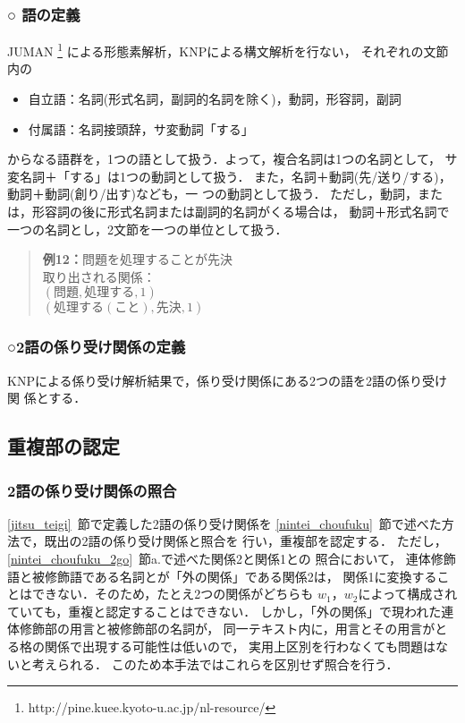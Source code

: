 \subsubsection*{○ 語の定義} \label{jitsu_teigi_go}
JUMAN
\footnote{http://pine.kuee.kyoto-u.ac.jp/nl-resource/}
による形態素解析，KNP\footnotemark[3]
による構文解析を行ない，
それぞれの文節内の
\begin{itemize}
\item 自立語：名詞(形式名詞，副詞的名詞を除く)，動詞，形容詞，副詞
\item 付属語：名詞接頭辞，サ変動詞「する」
\end{itemize}
からなる語群を，1つの語として扱う．よって，複合名詞は1つの名詞として，
サ変名詞＋「する」は1つの動詞として扱う．
また，名詞＋動詞(先/送り/する)，動詞＋動詞(創り/出す)なども，一
つの動詞として扱う．
ただし，動詞，または，形容詞の後に形式名詞または副詞的名詞がくる場合は，
動詞＋形式名詞で一つの名詞とし，2文節を一つの単位として扱う．
\vspace{5mm}\begin{quote}
{\bf 例12：}問題を処理することが先決\\
\hspace*{1em}取り出される関係：\\
\hspace*{2.5em} $(問題,処理する,1)$\\
\hspace*{2.5em} $(処理する(こと),先決,1)$
\end{quote}\vspace{5mm}

\subsubsection*{○2語の係り受け関係の定義} \label{jitsu_teigi_nigo}
KNPによる係り受け解析結果で，係り受け関係にある2つの語を2語の係り受け関
係とする．

\subsection{重複部の認定} \label{jitsu_nintei}
\subsubsection{2語の係り受け関係の照合} \label{jitsu_nintei_2go}
\ref{jitsu_teigi}~節で定義した2語の係り受け関係を
\ref{nintei_choufuku}~節で述べた方法で，既出の2語の係り受け関係と照合を
行い，重複部を認定する．
ただし，\ref{nintei_choufuku_2go}~節a.で述べた関係2と関係1との
照合において，
連体修飾語と被修飾語である名詞とが「外の関係」である関係2は，
関係1に変換することはできない．そのため，たとえ2つの関係がどちらも
$w_{1}$，$w_{2}$によって構成されていても，重複と認定することはできない．
しかし，「外の関係」で現われた連体修飾部の用言と被修飾部の名詞が，
同一テキスト内に，用言とその用言がとる格の関係で出現する可能性は低いので，
実用上区別を行わなくても問題はないと考えられる．
このため本手法ではこれらを区別せず照合を行う．

